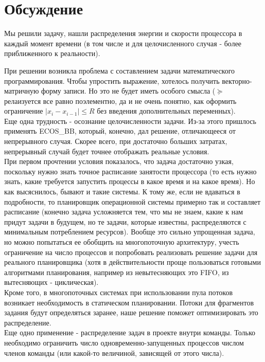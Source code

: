 \documentclass{article}
\begin{document}
\section{Обсуждение}

Мы решили задачу, нашли распределения энергии и скорости процессора в каждый момент времени (в том числе и для целочисленного случая - более приближенного к реальности).

При решении возникла проблема с составлением задачи математического программирования. Чтобы упростить выражение, хотелось получить векторно-матричную форму записи. Но это не будет иметь особого смысла ($\succeq$ релаизуется все равно поэлементно, да и не очень понятно, как оформить ограничение $|x_i-x_{i-1}| \le R$ без введения дополнительных переменных). \\

Еще одна трудность - осознание целочисленности задачи. Из-за этого пришлось применять ECOS\_BB, который, конечно, дал решение, отличающееся от непрерывного случая. Скорее всего, при достаточно больших затратах, непрерывный случай будет точнее отображать реальные условия.\\

При первом прочтении условия показалось, что задача достаточно узкая, поскольку нужно знать точное расписание занятости процессора (то есть нужно знать, какие требуется запустить процессы в какое время и на какое время). Но как высяснилось, бывают и такие системы. К тому же, если не вдаваться в подробности, то планировщик операционной системы примерно так и составляет расписание (конечно задача усложняется тем, что мы не знаем, какие к нам придут задачи в будущем, но те задачи, которые известны, распределяются с минимальным потреблением ресурсов). Вообще это сильно упрощенная задача, но можно попытаться ее обобщить на многопоточную архитектуру, учесть ограничение на число процессов и попробовать реализовать решение задачи для реального планировщика (хотя в действительности проще пользоваться готовыми алгоритмами планирования, например из невытесняющих это FIFO, из вытесняющих - циклическая).\\

Кроме того, в многопоточных системах при использовании пула потоков возникает необходимость в статическом планировании. Потоки для фрагментов задания будут определяться заранее, наше решение поможет оптимизировать это распределение.\\

Еще одно применение - распределение задач в проекте внутри команды. Только необходимо ограничить число одновременно-запущенных процессов числом членов команды (или какой-то величиной, зависящей от этого числа).\\
\end{document}
